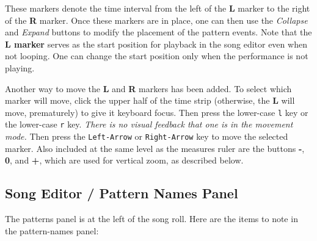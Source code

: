    These markers denote the time interval from the left of the 
   \textbf{L} marker to the right of the \textbf{R} marker.
   Once these markers are in place, one can then use
   the \textsl{Collapse} and \textsl{Expand} buttons to modify the
   placement of the pattern events.
   Note that the \textbf{L marker} serves as the start position for playback
   in the song editor even when not looping.
   One can change the start position only when the
   performance is not playing.

   Another way to move the \textbf{L} and \textbf{R} markers has been added.
   To select which marker will move, click the upper half of the time
   strip (otherwise, the \textbf{L} will move,
   prematurely) to give it keyboard focus.
   Then press the lower-case
   \texttt{l} key or the lower-case
   \texttt{r} key.
   \textsl{There is no visual feedback that one is in the movement mode.}
   Then press the \texttt{Left-Arrow} or \texttt{Right-Arrow}
   key to move the selected marker.
   Also included at the same level as the measures ruler are the buttons
   \textbf{-}, \textbf{0}, and \textbf{+},
   which are used for vertical zoom, as described below.

\subsection{Song Editor / Pattern Names Panel}
\label{subsec:song_editor_patterns_panel}

   The patterns panel is at the left of the song roll.
   Here are the items to note in the pattern-names panel:

